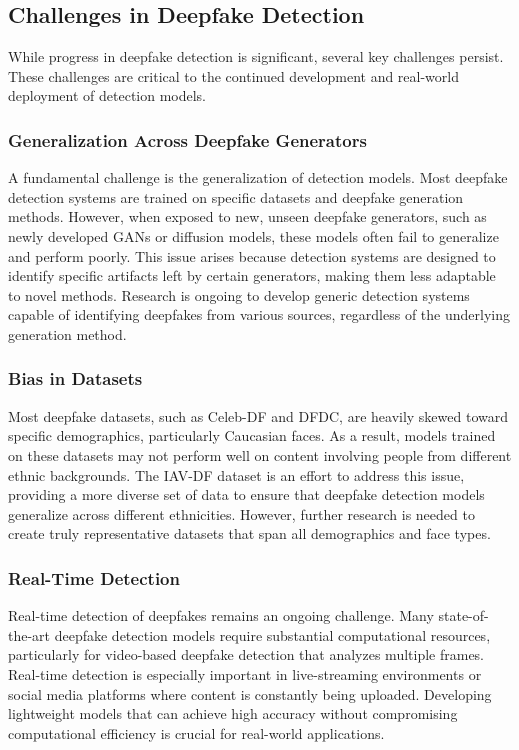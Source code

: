 \documentclass[lettersize,journal]{IEEEtran}
\begin{document}
\subsection{Challenges in Deepfake Detection}

While progress in deepfake detection is significant, several key challenges persist. These challenges are critical to the continued development and real-world deployment of detection models.

\subsubsection{Generalization Across Deepfake Generators}

A fundamental challenge is the generalization of detection models. Most deepfake detection systems are trained on specific datasets and deepfake generation methods. However, when exposed to new, unseen deepfake generators, such as newly developed GANs or diffusion models, these models often fail to generalize and perform poorly. This issue arises because detection systems are designed to identify specific artifacts left by certain generators, making them less adaptable to novel methods. Research is ongoing to develop generic detection systems capable of identifying deepfakes from various sources, regardless of the underlying generation method.
\cite{masood2023deepfakes}

\subsubsection{ Bias in Datasets}

Most deepfake datasets, such as Celeb-DF and DFDC, are heavily skewed toward specific demographics, particularly Caucasian faces. As a result, models trained on these datasets may not perform well on content involving people from different ethnic backgrounds. The IAV-DF dataset is an effort to address this issue, providing a more diverse set of data to ensure that deepfake detection models generalize across different ethnicities. However, further research is needed to create truly representative datasets that span all demographics and face types.\cite{shao2025robust}

\subsubsection{Real-Time Detection}

Real-time detection of deepfakes remains an ongoing challenge. Many state-of-the-art deepfake detection models require substantial computational resources, particularly for video-based deepfake detection that analyzes multiple frames. Real-time detection is especially important in live-streaming environments or social media platforms where content is constantly being uploaded. Developing lightweight models that can achieve high accuracy without compromising computational efficiency is crucial for real-world applications.
\end{document}
